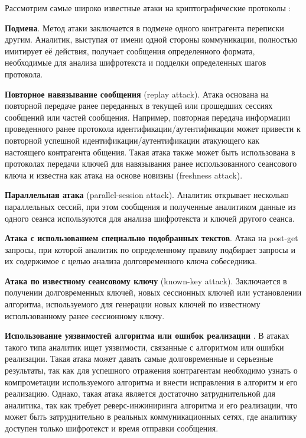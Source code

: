 	Рассмотрим самые широко известные  атаки на криптографические протоколы \cite{CryproAttackDiscribe} : %
	
	
	\textbf{Подмена}. Метод атаки заключается в подмене одного контрагента переписки другим. Аналитик,  выступая от имени одной стороны коммуникации, полностью имитирует её действия, получает сообщения определенного формата, необходимые для анализа шифротекста и подделки определенных шагов протокола.
	
	\textbf{Повторное навязывание сообщения} (replay attack). Атака основана на повторной передаче ранее переданных в текущей или прошедших сессиях  сообщений или частей сообщения. Например, повторная передача  информации проведенного ранее протокола идентификации/аутентификации может привести к повторной успешной идентификации/аутентификации атакующего как настоящего контрагента общения. Такая атака также может быть использована в протоколах передачи ключей для навязывания ранее использованного сеансового ключа и известна как атака на основе новизны (freshness attack).
	
	\textbf{Параллельная атака} (parallel-session attack). Аналитик открывает несколько параллельных сессий, при этом сообщения и полученные аналитиком  данные  из одного сеанса используются для   анализа шифротекста и ключей другого сеанса.
	
	\textbf{Атака с использованием специально подобранных текстов}. Атака на post-get запросы, при которой аналитик по определенному правилу подбирает запросы и их содержимое с целью анализа долговременного ключа собеседника.
	
	\textbf{Атака по известному сеансовому ключу} (known-key attack). Заключается в получении долговременных ключей, новых сессионных ключей или установлении алгоритма, используемого для генерации новых ключей по известному использованному ранее сессионному ключу.
	
	\textbf{Использование уязвимостей  алгоритма или ошибок реализации }. 	В атаках такого типа аналитик ищет уязвимости, связанные с алгоритмом или ошибки реализации. Такая атака может давать самые долговременные и серьезные результаты, так как для успешного отражения контрагентам необходимо узнать о компрометации используемого алгоритма и внести исправления в алгоритм и его реализацию. Однако, такая атака является достаточно затруднительной для аналитика, так как требует реверс-инжиниринга  алгоритма и его реализации, что может быть затруднительно в реальных коммуникационных сетях, где аналитику доступен только шифротекст и время отправки сообщения.\\
	
